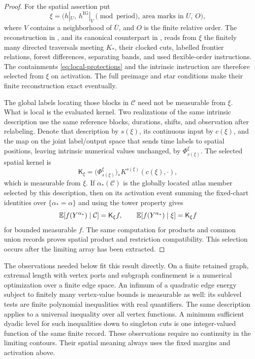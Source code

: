 \begin{proof}
For the spatial assertion put
\begin{equation}
 \xi=\bigl(h|_U,\ h^{\mathrm{IG}}|_V
       \pmod{\text{period}},\ \text{area marks in }U,\ O\bigr),
 \label{eq:spatial-input}
\end{equation}
where \(V\) contains a neighborhood of \(\overline U\), and \(O\)
is the finite relative order.  The reconstruction in
\cite[Theorem~7.13]{P}, and its canonical counterpart in
\cite[Section~5]{C}, reads from \(\xi\) the finitely many directed
traversals meeting \(K_*\), their clocked cuts, labelled frontier
relations, forest differences, separating bands, and used
flexible-order instructions.  The containments
\eqref{eq:local-protections} and the intrinsic instruction are
therefore selected from \(\xi\) on activation.  The full preimage
and star conditions make their finite reconstruction exact eventually.

The global labels locating those blocks in \(\mathcal C\) need not be
measurable from \(\xi\).  What is local is the evaluated kernel.
Two realizations of the same intrinsic description use the same
reference blocks, durations, shifts, and observation after relabeling.
Denote that description by \(s(\xi)\), its continuous input by
\(c(\xi)\), and the map on the joint label/output space that sends
time labels to spatial positions, leaving intrinsic numerical values
unchanged, by \(\Phi^\xi_{s(\xi)}\).  The selected spatial kernel is
\begin{equation}
 \mathsf K_\xi
   =\bigl(\Phi^\xi_{s(\xi)}\bigr)_*
       K^{s(\xi)}(c(\xi),\cdot),
 \label{eq:spatial-kernel}
\end{equation}
which is measurable from \(\xi\).  If \(\alpha_*(\mathcal C)\) is the
globally located atlas member selected by this description, then on
its activation event summing the fixed-chart identities over
\(\{\alpha_*=\alpha\}\) and using the tower property gives
\begin{equation}
 \mathbb E[f(Y^{\alpha_*})\mid\mathcal C]=\mathsf K_\xi f,\qquad
 \mathbb E[f(Y^{\alpha_*})\mid\xi]=\mathsf K_\xi f
 \label{eq:spatial-selection}
\end{equation}
for bounded measurable \(f\).  The same computation for products and
common union records proves spatial product and restriction
compatibility.  This selection occurs after the limiting array has
been extracted.
\end{proof}

The observations needed below fit this result directly.  On a finite
retained graph, extremal length with vertex ports and subgraph
confinement is a numerical optimization over a finite edge space.  An
infimum of a quadratic edge energy subject to finitely many vertex-value
bounds is measurable as well: its sublevel tests are finite polynomial
inequalities with real quantifiers.  The same description applies to
a universal inequality over all vertex functions.  A minimum
sufficient dyadic level for such inequalities down to singleton cuts
is one integer-valued function of the same finite record.  These
observations require no continuity in the limiting contours.  Their
spatial meaning always uses the fixed margins and activation above.

